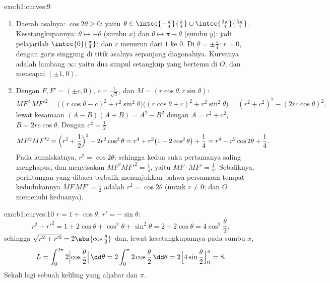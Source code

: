 \begin{solution}{exo:b1:curves:9}
\begin{enumerate}
  \item Daerah asalnya: $\cos 2\theta \geq 0$: yaitu $\theta \in
        \intcc{-\frac\pi4}{\frac\pi4} \cup
        \intcc{\frac{3\pi}{4}}{\frac{5\pi}{4}}$. Kesetangkupannya: $\theta
        \mapsto -\theta$ (sumbu $x$) dan $\theta \mapsto \pi -
        \theta$ (sumbu $y$): jadi pelajarilah $\intcc{0}{\frac\pi4}$; dan $r$
        menurun dari $1$ ke $0$. Di $\theta = \pm\frac\pi4$: $r =
        0$, dengan garis singgung di titik asalnya sepanjang diagonalnya. Kurvanya adalah
        lambang $\infty$: yaitu dua simpul setangkup yang bertemu di $O$,
        dan mencapai $(\pm 1, 0)$.
  \item Dengan $F, F' = (\pm c, 0)$, $c = \frac{1}{\sqrt 2}$, dan $M
        = (r\cos\theta, r\sin\theta)$:
        \[
        MF^2\, MF'^2
        = \bigl((r\cos\theta - c)^2 + r^2\sin^2\theta\bigr)
        \bigl((r\cos\theta + c)^2 + r^2\sin^2\theta\bigr)
        = (r^2 + c^2)^2 - (2rc\cos\theta)^2 ,
        \]
        lewat kesamaan $(A - B)(A + B) = A^2 - B^2$ dengan $A = r^2
        + c^2$, $B = 2rc\cos\theta$. Dengan $c^2 = \frac12$:
        \[
        MF^2 MF'^2 = \Bigl(r^2 + \frac12\Bigr)^2 - 2r^2\cos^2\theta
        = r^4 + r^2\bigl(1 - 2\cos^2\theta\bigr) + \frac14
        = r^4 - r^2\cos 2\theta + \frac14 .
        \]
        Pada lemniskatnya, $r^2 = \cos 2\theta$: sehingga kedua suku pertamanya
        saling menghapus, dan menyisakan $MF^2MF'^2 = \frac14$, yaitu $MF \cdot MF' =
        \frac12$. Sebaliknya, perhitungan yang dibaca terbalik menunjukkan
        bahwa persamaan tempat kedudukannya $MF\,MF' = \frac12$ adalah $r^2 = \cos
        2\theta$ (untuk $r \neq 0$; dan $O$ memenuhi keduanya).
\end{enumerate}
\end{solution}

\begin{solution}{exo:b1:curves:10}
$r = 1 + \cos\theta$, $r' = -\sin\theta$:
\[
r^2 + r'^2 = 1 + 2\cos\theta + \cos^2\theta + \sin^2\theta
= 2 + 2\cos\theta = 4\cos^2\frac\theta2 ,
\]
sehingga $\sqrt{r^2 + r'^2} = 2\abs{\cos\frac\theta2}$ dan, lewat
kesetangkupannya pada sumbu $x$,
\[
L = \int_0^{2\pi} 2\Bigl|\cos\frac\theta2\Bigr|\,\dd\theta
= 2\int_0^{\pi} 2\cos\frac\theta2\,\dd\theta
= 2\Bigl[4\sin\frac\theta2\Bigr]_0^{\pi} = 8 .
\]
Sekali lagi sebuah keliling yang aljabar dan  $\pi$.
\end{solution}

